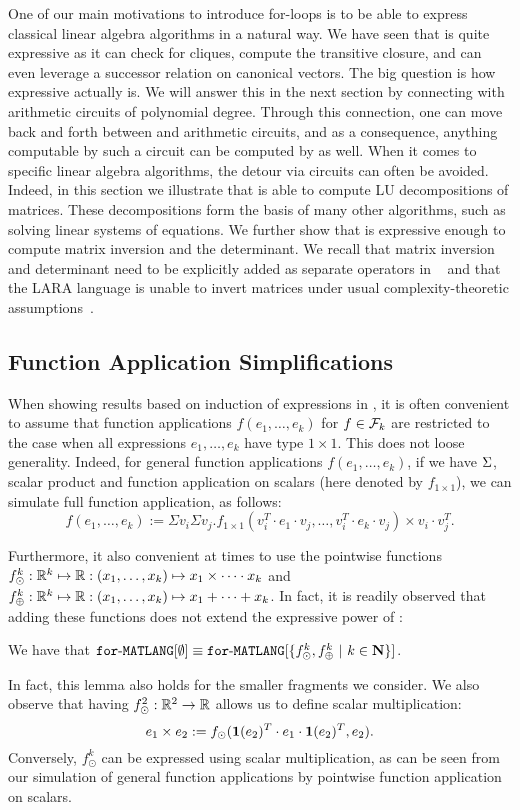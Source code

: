 One of our main motivations to introduce for-loops is to be able
to express classical linear algebra algorithms in a natural way. We have seen that \langfor is
quite expressive as it can check for cliques, compute the transitive closure, and can even
leverage a successor relation on canonical vectors. The big question is how expressive \langfor
actually is. We will answer this in the next section by connecting \langfor with 
arithmetic circuits of polynomial degree. Through this connection, one can move back and forth between \langfor and arithmetic circuits, and as a consequence, anything computable by such a circuit can be
computed by \langfor as well. When it comes to specific linear algebra algorithms, the detour via circuits
can often be avoided. Indeed, in this section we illustrate that \langfor is able to
compute LU decompositions of matrices. These decompositions form the basis of many other algorithms, such as solving linear systems of equations. We further show that \langfor is expressive enough to compute matrix inversion and the determinant. We recall that matrix inversion and determinant need to be explicitly added as separate operators in \lang~\cite{matlang-journal} and that the LARA language is unable to invert matrices under usual complexity-theoretic assumptions~\cite{BarceloH0S20}.

\subsection{Function Application Simplifications}\label{sec:queries:simp}

When showing results based on induction of expressions in \langfor, it is often convenient to assume that function applications $f(e_1,\ldots,e_k)$ for $f\in\mathcal{F}_k$ are restricted to
the case when all expressions $e_1,\ldots,e_k$ have type $1\times 1$. This does not loose generality. Indeed,
for general function applications $f(e_1,\ldots,e_k)$, if we have $\Sigma$, scalar product and function application on scalars (here denoted by $f_{1\times 1}$), we can simulate full function application, as follows:
 $$
f(e_1,\ldots, e_k) :=\Sigma v_i \Sigma v_j. f_{1\times 1}(v_i^T\cdot e_1\cdot v_j, \ldots ,v_i^T\cdot e_k\cdot v_j) \times v_i\cdot v_j^T.
$$

Furthermore, it also convenient at times to use the pointwise functions
$f_\odot^k:\mathbb{R}^k\mapsto \mathbb{R}:(x_1,\ldots,x_k)\mapsto x_1\times\cdots \cdot x_k$ and 
$f_\oplus^k:\mathbb{R}^k\mapsto \mathbb{R}:(x_1,\ldots,x_k)\mapsto x_1+\cdots + x_k$. In fact, it is readily observed that adding these functions does not extend the expressive power of \langfor:
\begin{lemma}
\label{lm-prod-sum}
We have that $\texttt{for}\text{-}\texttt{MATLANG}[\emptyset] \equiv \texttt{for}\text{-}\texttt{MATLANG}[\{f_\odot^k,f_\oplus^k \ | \ k\in \mathbf{N}\}]$.
\end{lemma}
In fact, this lemma also holds for the smaller fragments we consider.
%
We also observe that having $f_\odot^2:\mathbb{R}^2\to\mathbb{R}$ allows us to define scalar multiplication:
$$
e_1\times e_2 :=f_{\odot}(\mathbf{1}(e_2)^T\cdot e_1 \cdot \mathbf{1}(e_2)^T, e_2).
$$
Conversely, $f_\odot^k$ can be expressed using scalar multiplication, as can be seen from our simulation of general function applications by pointwise function application on scalars.

